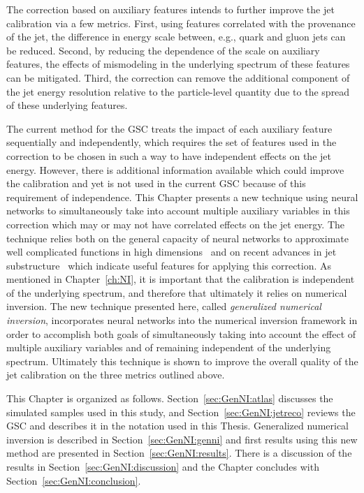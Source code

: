 The correction based on auxiliary features intends to further improve the jet calibration via a few metrics.
First, using features correlated with the provenance of the jet, the difference in energy scale between, e.g., quark and gluon jets can be reduced.
Second, by reducing the dependence of the scale on auxiliary features, the effects of mismodeling in the underlying spectrum of these features can be mitigated.
Third, the correction can remove the additional component of the jet energy resolution relative to the particle-level quantity due to the spread of these underlying features.

The current method for the GSC treats the impact of each auxiliary feature sequentially and independently, which requires the set of features used in the correction to be chosen in such a way to have independent effects on the jet energy.
However, there is additional information available which could improve the calibration and yet is not used in the current GSC because of this requirement of independence.
This Chapter presents a new technique using neural networks to simultaneously take into account multiple auxiliary variables in this correction which may or may not have correlated effects on the jet energy.
The technique relies both on the general capacity of neural networks to approximate well complicated functions in high dimensions~\cite{HORNIK1991251} and on recent advances in jet substructure~\cite{Larkoski:2017jix} which indicate useful features for applying this correction.
As mentioned in Chapter~\ref{ch:NI}, it is important that the calibration is independent of the underlying \pt{} spectrum, and therefore that ultimately it relies on numerical inversion.
The new technique presented here, called \textit{generalized numerical inversion}, incorporates neural networks into the numerical inversion framework in order to accomplish both goals of simultaneously taking into account the effect of multiple auxiliary variables and of remaining independent of the underlying spectrum.
Ultimately this technique is shown to improve the overall quality of the jet calibration on the three metrics outlined above.

This Chapter is organized as follows.
Section~\ref{sec:GenNI:atlas} discusses the simulated samples used in this study, and Section~\ref{sec:GenNI:jetreco} reviews the GSC and describes it in the notation used in this Thesis.
Generalized numerical inversion is described in Section~\ref{sec:GenNI:genni} and first results using this new method are presented in Section~\ref{sec:GenNI:results}.
There is a discussion of the results in Section~\ref{sec:GenNI:discussion} and the Chapter concludes with Section~\ref{sec:GenNI:conclusion}.

